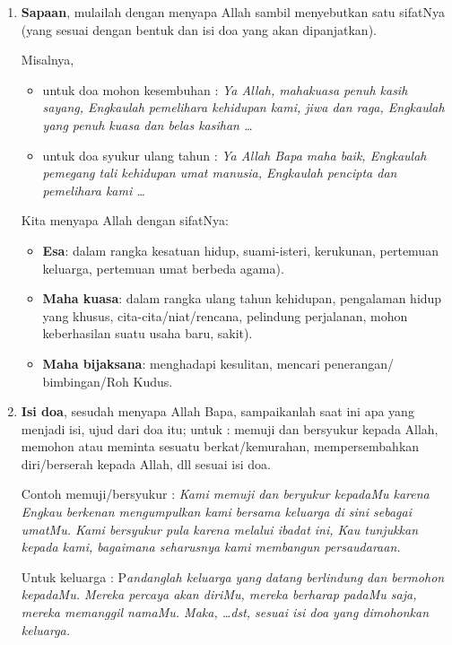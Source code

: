 \begin{enumerate}[label=\textbf{\Roman*.}]
\item  \textbf{Sapaan}, mulailah dengan menyapa Allah sambil menyebutkan satu sifatNya (yang sesuai dengan bentuk dan isi doa yang akan dipanjatkan). 

Misalnya, 

\begin{itemize}
\item untuk doa mohon kesembuhan : \textit{Ya Allah, mahakuasa penuh kasih sayang, Engkaulah pemelihara kehidupan kami, jiwa dan raga, Engkaulah yang penuh kuasa dan belas kasihan \ldots }

\item untuk doa syukur ulang tahun : \textit{Ya Allah Bapa maha baik, Engkaulah pemegang tali kehidupan umat manusia, Engkaulah pencipta dan pemelihara kami \ldots}
\end{itemize}

Kita menyapa Allah dengan sifatNya: 
\begin{itemize}
\item \textbf{Esa}: dalam rangka kesatuan hidup, suami-isteri, kerukunan, pertemuan keluarga, pertemuan umat berbeda agama). 
\item \textbf{Maha kuasa}: dalam rangka ulang tahun kehidupan, pengalaman hidup yang khusus, cita-cita/niat/rencana, pelindung perjalanan, mohon keberhasilan suatu usaha baru, sakit). 

\item \textbf{Maha bijaksana}: menghadapi kesulitan, mencari penerangan/ bimbingan/Roh Kudus.  

\end{itemize}

\item \textbf{Isi doa}, sesudah menyapa Allah Bapa, sampaikanlah saat ini apa yang menjadi isi, ujud dari doa itu;  untuk : memuji dan bersyukur kepada Allah, memohon atau meminta sesuatu berkat/kemurahan, mempersembahkan diri/berserah kepada Allah, dll sesuai isi doa.

Contoh memuji/bersyukur : \textit{Kami memuji dan beryukur kepadaMu karena Engkau berkenan mengumpulkan kami bersama keluarga di sini sebagai umatMu. Kami bersyukur pula karena melalui ibadat ini, Kau tunjukkan kepada kami, bagaimana seharusnya kami membangun persaudaraan.}

Untuk keluarga : P\textit{andanglah keluarga yang datang berlindung dan bermohon kepadaMu. Mereka percaya akan diriMu, mereka berharap padaMu saja, mereka memanggil namaMu. Maka, \ldots dst, sesuai isi doa yang dimohonkan keluarga.}


\end{enumerate}
